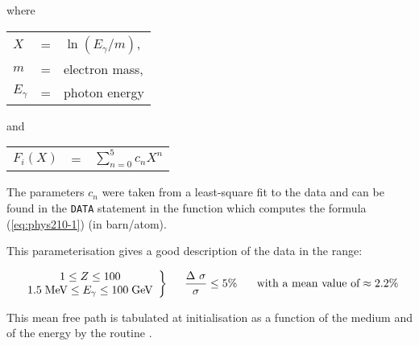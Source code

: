 where

\begin{tabular}[t]{p{1.3cm}ll}
$X$           & = & $\ln(E_\gamma/m)$,\\
$m$           & = & electron mass,\\
$E_\gamma$    & = & photon energy \\
\end{tabular}

and

\begin{tabular}[t]{p{1.3cm}ll}
$F_i(X)$      & = & $\displaystyle \sum_{n=0}^5 c_n X^n$ \\
\end{tabular}
 
The parameters $c_n$ were taken from a least-square fit to the data 
\cite{bib-HUBB}
and can be found in the {\tt DATA} statement in the 
function  which
computes the formula (\ref{eq:phys210-1}) (in barn/atom).
 
This parameterisation gives a good description of the data in the
range:
 
\begin{equation}
\left . \begin{array}{c} 1\leq Z\leq 100 \\
1.5 \; \mbox{MeV} \leq E_\gamma\leq 100 \; \mbox{GeV} 
\end{array} \right \} \hspace{0.5cm}
\frac{ \Delta\ \sigma}{\sigma}\leq 5\% 
        \mbox{\hspace{0.5cm} with a mean value of} \approx 2.2\% 
\end{equation}
 
This mean free path is tabulated at initialisation as a function
of the medium and of the energy by the routine .
 

